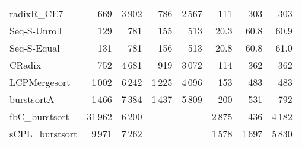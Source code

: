 \documentclass[a4paper]{myjournal}
\begin{document}
\begin{table}[p]
\begin{tabular}{l|rrrr*{3}{r}|}
     radixR\_CE7 &     669 & 3\,902 &    786 & 2\,567 &    111 &    303 &    303 \\
Seq-S-Unroll &     129 &    781 &    155 &    513 &   20.3 &   60.8 &   60.9 \\
 Seq-S-Equal &     131 &    781 &    156 &    513 &   20.8 &   60.8 &   61.0 \\
          CRadix &     752 & 4\,681 &    919 & 3\,072 &    114 &    362 &    362 \\
    LCPMergesort &  1\,002 & 6\,242 & 1\,225 & 4\,096 &    153 &    483 &    483 \\
      burstsortA &  1\,466 & 7\,384 & 1\,437 & 5\,809 &    200 &    531 &    792 \\
  fbC\_burstsort & 31\,962 & 6\,200 &        &        & 2\,875 &    436 & 4\,182 \\
 sCPL\_burstsort &  9\,971 & 7\,262 &        &        & 1\,578 & 1\,697 & 5\,830 \\ \hline
\end{tabular}
\end{table}
\end{document}
